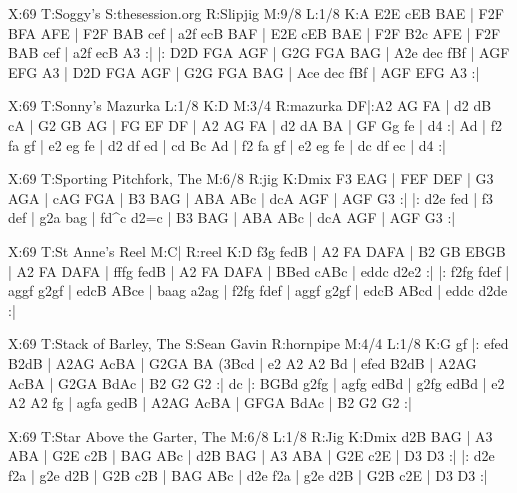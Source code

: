 \documentclass{article}
\begin{document}
\begin{abc}[name]
X:69
T:Soggy's
S:thesession.org
R:Slipjig
M:9/8
L:1/8
K:A
E2E cEB BAE | F2F BFA AFE | F2F BAB cef | a2f ecB BAF |
E2E cEB BAE | F2F B2c AFE | F2F BAB cef | a2f ecB A3 :|
|: D2D FGA AGF | G2G FGA BAG | A2e dec fBf | AGF EFG A3 |
D2D FGA AGF | G2G FGA BAG | Ace dec fBf | AGF EFG A3 :|
\end{abc}

\begin{abc}[name]
X:69
T:Sonny's Mazurka
L:1/8
K:D
M:3/4
R:mazurka
DF|:A2 AG FA | d2 dB cA | G2 GB AG | FG EF DF |
A2 AG FA | d2 dA BA | GF Gg fe | d4 :|
Ad | f2 fa gf | e2 eg fe | d2 df ed | cd Bc Ad |
f2 fa gf | e2 eg fe | dc df ec | d4 :|
\end{abc}

\begin{abc}[name]
X:69
T:Sporting Pitchfork, The
M:6/8
R:jig
K:Dmix
F3 EAG | FEF DEF | G3 AGA | cAG FGA | 
B3 BAG | ABA ABc | dcA AGF | AGF G3 :| 
|: d2e fed | f3 def | g2a bag | fd^c d2=c | 
B3 BAG | ABA ABc | dcA AGF | AGF G3 :|
\end{abc}

\begin{abc}[name]
X:69
T:St Anne's Reel
M:C|
R:reel
K:D
f3g fedB | A2 FA DAFA | B2 GB EBGB | A2 FA DAFA |
fffg fedB | A2 FA DAFA | BBed cABc | eddc d2e2 :|
|: f2fg fdef | aggf g2gf | edcB ABce | baag a2ag |
f2fg fdef | aggf g2gf | edcB ABcd | eddc d2de :|
\end{abc}

\begin{abc}[name]
X:69
T:Stack of Barley, The
S:Sean Gavin
R:hornpipe
M:4/4
L:1/8
K:G
gf |: efed B2dB | A2AG AcBA | G2GA BA (3Bcd | e2 A2 A2 Bd |
efed B2dB | A2AG AcBA | G2GA BdAc | B2 G2 G2 :|
dc |: BGBd g2fg | agfg edBd | g2fg edBd | e2 A2 A2 fg |
agfa gedB | A2AG AcBA | GFGA BdAc | B2 G2 G2 :|
\end{abc}

\begin{abc}[name]
X:69
T:Star Above the Garter, The
M:6/8
L:1/8
R:Jig
K:Dmix
d2B BAG | A3 ABA | G2E c2B | BAG ABc |
d2B BAG | A3 ABA | G2E c2E | D3 D3 :|
|: d2e f2a | g2e d2B | G2B c2B | BAG ABc |
d2e f2a | g2e d2B | G2B c2E | D3 D3 :|
\end{abc}
\end{document}
